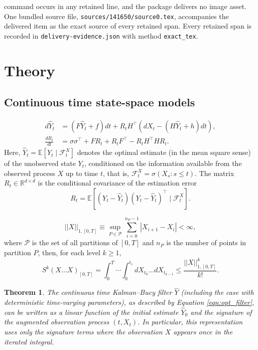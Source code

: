 \documentclass[10pt,a4paper]{amsart}
\theoremstyle{plain}
\newtheorem{theorem}{Theorem}
\theoremstyle{remark}
\begin{document}
command occurs in any retained line, and the package delivers no image asset. One bundled source file, \texttt{sources/141650/source0.tex}, accompanies the delivered item as the exact source of every retained span. Every retained span is recorded in \texttt{delivery-evidence.json} with method \texttt{exact\_tex}.
\section{Theory}\label{sec:background}

\subsection{Continuous time state-space models}\label{sec:cts_kf}

\begin{align}
    d\hat Y_t &= (F \hat Y_t +f)dt + R_tH^\top (dX_t -(H\hat Y_t+h)dt),\label{eqn:opt_filter}\\
    \frac{dR_t}{dt} &= \sigma \sigma^\top+F R_t + R_t F^\top - R_t H^\top H R_t. \label{eqn:filter_var}
\end{align}
Here, \(\hat{Y}_t = \mathbb{E}[Y_t \mid \mathcal{F}^X_t]\) denotes the optimal estimate (in the mean square sense) of the unobserved state \(Y_t\), conditioned on the information available from the observed process \(X\) up to time \(t\), that is, \(\mathcal{F}^X_t = \sigma(X_s : s \leq t)\).
The matrix \(R_t \in \mathbb{R}^{d \times d}\) is the conditional covariance of the estimation error
\[
R_t = \mathbb{E}[(Y_t - \hat{Y}_t)(Y_t - \hat{Y}_t)^\top \mid \mathcal{F}^X_t].
\]

\[||X||_{1,[0,T]} \equiv \sup_{P \in \mathcal{P}} \sum_{i=0}^{n_P-1} |X_{i+1} - X_i| <\infty,\]
where \(\mathcal{P}\) is the set of all partitions of \([0,T]\) and \(n_P\) is the number of points in partition \(P\), then, for each level \(k \geq 1\), 
\begin{equation}\label{eqn:sig_magnitude}
    S^k(X\dots X)_{[0,T]} = \int_0^{T}\cdots\int_0^{t_{1}} dX_{t_0}  \dots dX_{t_{k-1}} \leq \frac{||X||^k_{1,[0,T]}}{k!}.
\end{equation}

\begin{theorem}\label{thm:KalmanRepresentation}
The continuous time Kalman--Bucy filter $\hat Y$ (including the case with deterministic time-varying parameters), as described by Equation \eqref{eqn:opt_filter}, can be written as a linear function of the initial estimate $\hat Y_0$ and the signature of the augmented observation process $(t,X_t)$. In particular, this representation uses only the signature terms where the observation $X$ appears once in the iterated integral.
\end{theorem}
\end{document}
